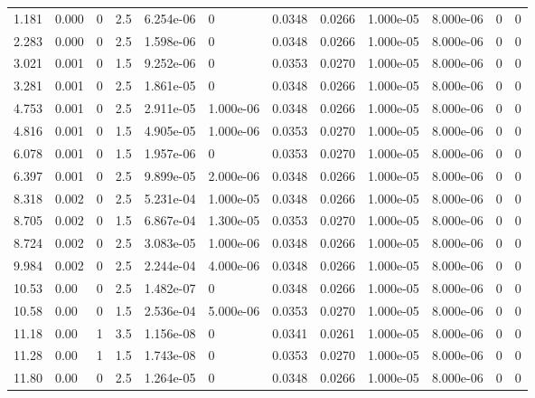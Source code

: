 \documentclass[preview]{standalone}
\begin{document}
{{\begin{tabular}{L{1.2cm}C{1.2cm} C{0.3cm}C{0.5cm} C{1.4cm}C{1.4cm} C{1.4cm}C{1.4cm} C{1.6cm}C{1.6cm} C{1.6cm}C{1.6cm}}
  1.181  &  0.000  & 0     & 2.5 &  6.254e-06  & 0  &  0.0348&   0.0266& 1.000e-05 & 8.000e-06   &  0 & 0  \\ 
  2.283  &  0.000  & 0     & 2.5 &  1.598e-06  & 0  &  0.0348&   0.0266& 1.000e-05 & 8.000e-06   &  0 & 0  \\ 
  3.021  &  0.001  & 0     & 1.5 &  9.252e-06  & 0  &  0.0353&   0.0270& 1.000e-05 & 8.000e-06   &  0 & 0  \\ 
  3.281  &  0.001  & 0     & 2.5 &  1.861e-05  & 0  &  0.0348&   0.0266& 1.000e-05 & 8.000e-06   &  0 & 0  \\ 
  4.753  &  0.001  & 0     & 2.5 &  2.911e-05  & 1.000e-06  &  0.0348&   0.0266& 1.000e-05 & 8.000e-06   &  0 & 0  \\ 
  4.816  &  0.001  & 0     & 1.5 &  4.905e-05  & 1.000e-06  &  0.0353&   0.0270& 1.000e-05 & 8.000e-06   &  0 & 0  \\ 
  6.078  &  0.001  & 0     & 1.5 &  1.957e-06  & 0  &  0.0353&   0.0270& 1.000e-05 & 8.000e-06   &  0 & 0  \\ 
  6.397  &  0.001  & 0     & 2.5 &  9.899e-05  & 2.000e-06  &  0.0348&   0.0266& 1.000e-05 & 8.000e-06   &  0 & 0  \\ 
  8.318  &  0.002  & 0     & 2.5 &  5.231e-04  & 1.000e-05  &  0.0348&   0.0266& 1.000e-05 & 8.000e-06   &  0 & 0  \\ 
  8.705  &  0.002  & 0     & 1.5 &  6.867e-04  & 1.300e-05  &  0.0353&   0.0270& 1.000e-05 & 8.000e-06   &  0 & 0  \\ 
  8.724  &  0.002  & 0     & 2.5 &  3.083e-05  & 1.000e-06  &  0.0348&   0.0266& 1.000e-05 & 8.000e-06   &  0 & 0  \\ 
  9.984  &  0.002  & 0     & 2.5 &  2.244e-04  & 4.000e-06  &  0.0348&   0.0266& 1.000e-05 & 8.000e-06   &  0 & 0  \\ 
  10.53  &  0.00  & 0     & 2.5 &  1.482e-07  & 0  &  0.0348&   0.0266& 1.000e-05 & 8.000e-06   &  0 & 0  \\ 
  10.58  &  0.00  & 0     & 1.5 &  2.536e-04  & 5.000e-06  &  0.0353&   0.0270& 1.000e-05 & 8.000e-06   &  0 & 0  \\ 
  11.18  &  0.00  & 1     & 3.5 &  1.156e-08  & 0  &  0.0341&   0.0261& 1.000e-05 & 8.000e-06   &  0 & 0  \\ 
  11.28  &  0.00  & 1     & 1.5 &  1.743e-08  & 0  &  0.0353&   0.0270& 1.000e-05 & 8.000e-06   &  0 & 0  \\ 
  11.80  &  0.00  & 0     & 2.5 &  1.264e-05  & 0  &  0.0348&   0.0266& 1.000e-05 & 8.000e-06   &  0 & 0  \\ 

\end{tabular}}}
\end{document}
